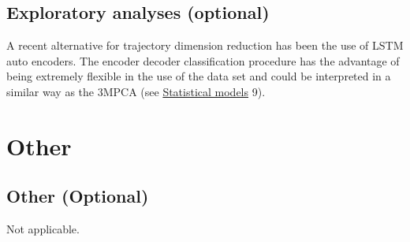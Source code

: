 \documentclass[]{article}
\begin{document}
\hypertarget{exploratory-analyses-optional}{%
\subsection{Exploratory analyses
(optional)}\label{exploratory-analyses-optional}}

A recent alternative for trajectory dimension reduction has been the use
of LSTM auto encoders. The encoder decoder classification procedure has
the advantage of being extremely flexible in the use of the data set and
could be interpreted in a similar way as the 3MPCA (see
\protect\hyperlink{statistical-models}{Statistical models} 9).

\hypertarget{other}{%
\section{Other}\label{other}}

\hypertarget{other-optional}{%
\subsection{Other (Optional)}\label{other-optional}}

Not applicable.

\hypertarget{section}{%
\subsection{}\label{section}}

\vspace{-2pc}
\setlength{\parindent}{-0.5in}
\setlength{\leftskip}{-1in}
\setlength{\parskip}{8pt}

\noindent


\end{document}

